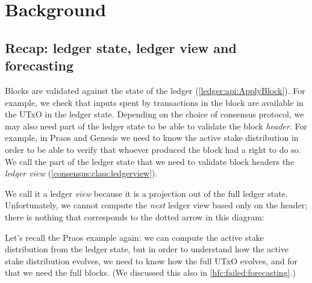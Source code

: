 \section{Background}

\subsection{Recap: ledger state, ledger view and forecasting}

Blocks are validated against the state of the ledger
(\cref{ledger:api:ApplyBlock}). For example, we check that inputs spent by
transactions in the block are available in the UTxO in the ledger state.
Depending on the choice of consensus protocol, we may also need part of the
ledger state to be able to validate the block \emph{header}. For example, in
Praos and Genesis we need to know the active stake distribution in order to be
able to verify that whoever produced the block had a right to do so. We call the
part of the ledger state that we need to validate block headers the \emph{ledger
view} (\cref{consensus:class:ledgerview}).

We call it a ledger \emph{view} because it is a projection out of the full
ledger state. Unfortunately, we cannot compute the \emph{next} ledger view based only
on the header; there is nothing that corresponds to the dotted arrow in this
diagram:
%
\begin{center}
\end{center}
%
Let's recall the Praos example again: we can compute the active stake
distribution from the ledger state, but in order to understand how the active
stake distribution evolves, we need to know how the full UTxO evolves, and for
that we need the full blocks. (We discussed this also in
\cref{hfc:failed:forecasting}.)

